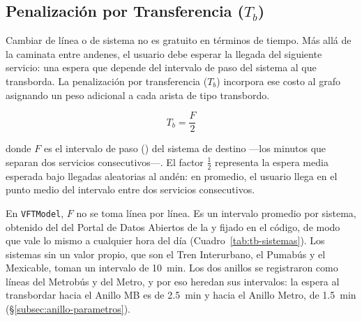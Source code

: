 \subsection{Penalización por Transferencia (\texorpdfstring{$T_b$}{Tb})}
\label{subsec:fase2-tb}

Cambiar de línea o de sistema no es gratuito en términos de tiempo. Más allá de
la caminata entre andenes, el usuario debe esperar la llegada del siguiente
servicio: una espera que depende del intervalo de paso del sistema al que
transborda. La penalización por transferencia ($T_b$) incorpora ese costo al
grafo asignando un peso adicional a cada arista de tipo transbordo.

\begin{equation}
    T_b = \frac{F}{2}
    \label{eq:penalizacion-transferencia}
\end{equation}

\noindent donde $F$ es el intervalo de paso () del
sistema de destino —los minutos que separan dos servicios consecutivos—. El
factor $\tfrac{1}{2}$ representa la espera media esperada bajo llegadas
aleatorias al andén: en promedio, el usuario llega en el punto medio del
intervalo entre dos servicios consecutivos.

En \texttt{VFTModel}, $F$ no se toma línea por línea. Es un intervalo promedio
por sistema, obtenido del \gtfs{} del Portal de Datos Abiertos de la \cdmx{}
\citep{adip_gtfs_2024} y fijado en el código, de modo que vale lo mismo a
cualquier hora del día (Cuadro~\ref{tab:tb-sistemas}). Los sistemas sin un valor
propio, que son el Tren Interurbano, el Pumabús y el Mexicable, toman un
intervalo de 10~min. Los dos anillos se registraron como líneas del Metrobús y
del Metro, y por eso heredan sus intervalos: la espera al transbordar hacia el
Anillo MB es de 2.5~min y hacia el Anillo Metro, de 1.5~min
(§\ref{subsec:anillo-parametros}).

